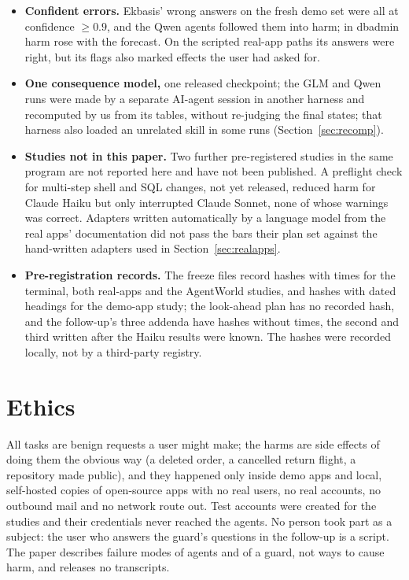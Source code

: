 \documentclass[11pt]{article}
\begin{document}
\begin{itemize}
  intervals over 24 to 30 tasks are optimistic. The terminal results on planted user work rest on 9 sessions per arm, and the follow-up's Sonnet arms ran once per
  task.
  \item \textbf{Confident errors.} Ekbasis' wrong answers on the fresh demo set were all at confidence $\ge 0.9$, and
  the Qwen agents followed them into harm; in dbadmin harm rose with the forecast. On the scripted real-app paths its answers
  were right, but its flags also marked effects the user had asked for.
  \item \textbf{One consequence model,} one released checkpoint; the GLM and Qwen runs were made by a separate AI-agent
  session in another harness and recomputed by us from its tables, without re-judging the final states; that harness
also loaded an unrelated skill in some runs (Section~\ref{sec:recomp}).
  \item \textbf{Studies not in this paper.} Two further pre-registered studies in the same program are not reported here
  and have not been published. A preflight check for multi-step shell and SQL changes, not yet released, reduced harm for
  Claude Haiku but only interrupted Claude Sonnet, none of whose warnings was correct. Adapters written automatically by a
  language model from the real apps' documentation did not pass the bars their plan set against the hand-written
  adapters used in Section~\ref{sec:realapps}.
  \item \textbf{Pre-registration records.} The freeze files record hashes with times for the terminal, both real-apps and
  the AgentWorld studies, and hashes with dated headings for the demo-app study; the look-ahead plan has no recorded hash,
  and the follow-up's three addenda have hashes without times, the second and third written after the Haiku results were
  known. The hashes were recorded locally, not by a third-party registry.
\end{itemize}

\section{Ethics}\label{sec:ethics}
All tasks are benign requests a user might make; the harms are side effects of doing them the obvious way (a deleted
order, a cancelled return flight, a repository made public), and they happened only inside demo apps and local,
self-hosted copies of open-source apps with no real users, no real accounts, no outbound mail and no network route out.
Test accounts were created for the studies and their credentials never reached the agents. No person took part as a
subject: the user who answers the guard's questions in the follow-up is a script. The paper describes failure modes of
agents and of a guard, not ways to cause harm, and releases no transcripts.
\end{document}
